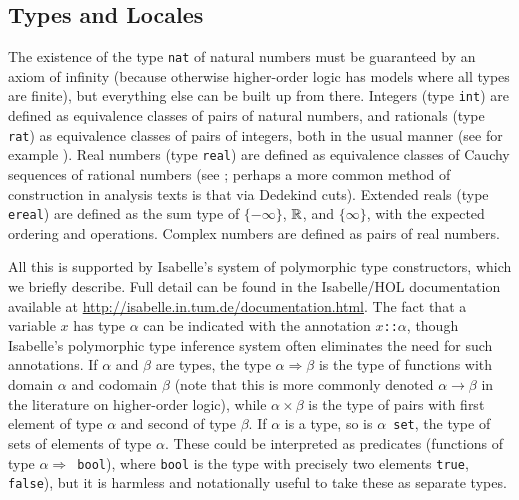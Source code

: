 \documentclass[leqno]{article}
\theoremstyle{definition}
\begin{document}
\subsection{Types and Locales} \label{sec:loc}

The existence of the type \texttt{nat} of natural numbers must be guaranteed by an axiom of infinity (because otherwise higher-order logic has models where all types are finite), but everything else can be built up from there. Integers (type \texttt{int}) are defined as equivalence classes of pairs of natural numbers, and rationals (type \texttt{rat}) as equivalence classes of pairs of integers, both in the usual manner (see for example \cite{enderton}). Real numbers (type \texttt{real}) are defined as equivalence classes of Cauchy sequences of rational numbers (see \cite{suppes}; perhaps a more common method of construction in analysis texts is that via Dedekind cuts). Extended reals (type \texttt{ereal}) are defined as the sum type of $\{-\infty\}$, $\mathbb{R}$, and $\{\infty\}$, with the expected ordering and operations. Complex numbers are defined as pairs of real numbers.

All this is supported by Isabelle's system of polymorphic type constructors, which we briefly describe. Full detail can be found in the Isabelle/HOL documentation available at \url{http://isabelle.in.tum.de/documentation.html}. The fact that a variable $x$ has type $\alpha$ can be indicated with the annotation \texttt{$x$::$\alpha$}, though Isabelle's polymorphic type inference system often eliminates the need for such annotations. If $\alpha$ and $\beta$ are types, the type $\alpha \Rightarrow \beta$ is the type of functions with domain $\alpha$ and codomain $\beta$ (note that this is more commonly denoted $\alpha \rightarrow \beta$ in the literature on higher-order logic), while $\alpha \times \beta$ is the type of pairs with first element of type $\alpha$ and second of type $\beta$. If $\alpha$ is a type, so is \texttt{$\alpha$ set}, the type of sets of elements of type $\alpha$. These could be interpreted as predicates (functions of type \texttt{$\alpha \Rightarrow$ bool}), where \texttt{bool} is the type with precisely two elements \texttt{true}, \texttt{false}), but it is harmless and notationally useful to take these as separate types.
\end{document}
